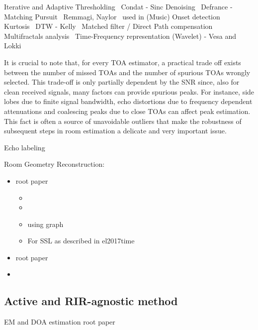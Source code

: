 Iterative and Adaptive Thresholding~
Condat - Sinc Denoising~
Defrance - Matching Pursuit~
Remmagi, Naylor~ used in 
(Music) Onset detection~
Kurtosis~
DTW - Kelly~
Matched filter / Direct Path compensation~
Multifractals analysis~
Time-Frequency representation (Wavelet) - Vesa and Lokki 


It is crucial to note that, for every TOA estimator, a practical trade off exists between the
number of missed TOAs and the number of spurious TOAs wrongly selected.
This trade-off is only partially dependent by the SNR since, also for clean received signals, many factors can provide spurious peaks.
For instance, side lobes due to finite signal bandwidth, echo distortions due to frequency dependent attenuations and coalescing peaks due to close TOAs can affect peak estimation.
This fact is often a source of unavoidable outliers that make the robustness of subsequent steps in room estimation a delicate and very important issue.

Echo labeling

Room Geometry Reconstruction:
\begin{itemize}
    \item {} root paper
    \begin{itemize}
        \item {}
        \item {}
        \item {} using graph
        \item For SSL as described in el2017time 
    \end{itemize}
    \item {} root paper
    \item {}
\end{itemize}


\subsection{Active and RIR-agnostic method}
EM and DOA estimation  root paper

